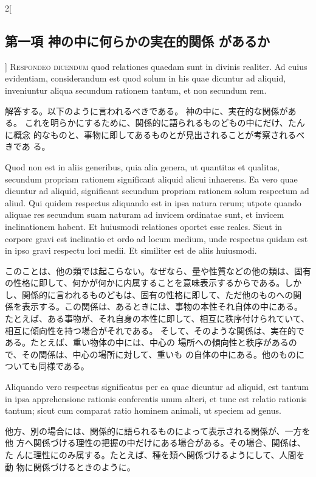 \documentclass[paper=a4paper,fontsize=10pt,jafontsize=9pt,titlepage]{jlreq}
\begin{document}
\begin{paracol}{2}[\subsection{第一項 神の中に何らかの実在的関係 があるか}]
{\scshape Respondeo dicendum} quod relationes quaedam sunt in divinis realiter. Ad
cuius evidentiam, considerandum est quod solum in his quae dicuntur ad
aliquid, inveniuntur aliqua secundum rationem tantum, et non secundum
rem.


\switchcolumn


解答する。以下のように言われるべきである。
神の中に、実在的な関係がある。
これを明らかにするために、関係的に語られるものどもの中にだけ、たんに概念
 的なものと、事物に即してあるものとが見出されることが考察されるべきであ
 る。


\switchcolumn*


Quod non est in aliis generibus, quia alia genera, ut quantitas et
qualitas, secundum propriam rationem significant aliquid alicui
inhaerens. Ea vero quae dicuntur ad aliquid, significant secundum
propriam rationem solum respectum ad aliud. Qui quidem respectus
aliquando est in ipsa natura rerum; utpote quando aliquae res secundum
suam naturam ad invicem ordinatae sunt, et invicem inclinationem
habent. 
Et huiusmodi relationes oportet esse reales. Sicut in corpore
gravi est inclinatio et ordo ad locum medium, unde respectus quidam est
in ipso gravi respectu loci medii. Et similiter est de aliis
huiusmodi.


\switchcolumn


このことは、他の類では起こらない。なぜなら、量や性質などの他の類は、固有
 の性格に即して、何かが何かに内属することを意味表示するからである。しか
 し、関係的に言われるものどもは、固有の性格に即して、ただ他のものへの関
 係を表示する。この関係は、あるときには、事物の本性それ自体の中にある。
 たとえば、ある事物が、それ自身の本性に即して、相互に秩序付けられていて、
 相互に傾向性を持つ場合がそれである。
そして、そのような関係は、実在的である。たとえば、重い物体の中には、中心の
 場所への傾向性と秩序があるので、その関係は、中心の場所に対して、重いも
 の自体の中にある。他のものについても同様である。


\switchcolumn*


Aliquando vero respectus significatus per ea quae dicuntur ad
aliquid, est tantum in ipsa apprehensione rationis conferentis unum
alteri, et tunc est relatio rationis tantum; sicut cum comparat ratio
hominem animali, ut speciem ad genus.


\switchcolumn


他方、別の場合には、関係的に語られるものによって表示される関係が、一方を他
 方へ関係づける理性の把握の中だけにある場合がある。その場合、関係は、た
 んに理性にのみ属する。たとえば、種を類へ関係づけるようにして、人間を動
 物に関係づけるときのように。



\end{paracol}
\end{document}
